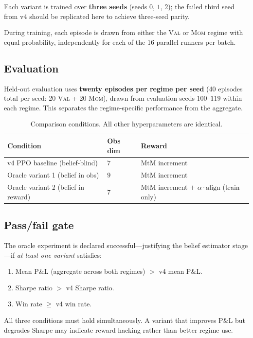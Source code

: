 \documentclass[11pt]{article}
\begin{document}
Each variant is trained over \textbf{three seeds} (seeds $0$, $1$, $2$);
the failed third seed from v4 should be replicated here to achieve
three-seed parity.

During training, each episode is drawn from either the \textsc{Val} or
\textsc{Mom} regime with equal probability, independently for each of
the 16 parallel runners per batch.

\subsection{Evaluation}

Held-out evaluation uses \textbf{twenty episodes per regime per seed}
(40 episodes total per seed: 20 \textsc{Val} + 20 \textsc{Mom}), drawn
from evaluation seeds $100$--$119$ within each regime.
This separates the regime-specific performance from the aggregate.

\begin{table}[H]
\centering
\begin{tabular}{lll}
\toprule
\textbf{Condition} & \textbf{Obs dim} & \textbf{Reward} \\
\midrule
v4 PPO baseline (belief-blind) & $7$ & MtM increment \\
Oracle variant 1 (belief in obs) & $9$ & MtM increment \\
Oracle variant 2 (belief in reward) & $7$ & MtM increment $+$ $\alpha \cdot \text{align}$ (train only) \\
\bottomrule
\end{tabular}
\caption{Comparison conditions. All other hyperparameters are identical.}
\label{tab:conditions}
\end{table}

\subsection{Pass/fail gate}

The oracle experiment is declared successful---justifying the belief
estimator stage---if \emph{at least one variant} satisfies:
\begin{enumerate}
  \item Mean P\&L (aggregate across both regimes) $>$ v4 mean P\&L.
  \item Sharpe ratio $>$ v4 Sharpe ratio.
  \item Win rate $\ge$ v4 win rate.
\end{enumerate}
All three conditions must hold simultaneously. A variant that improves
P\&L but degrades Sharpe may indicate reward hacking rather than better
regime use.
\end{document}
